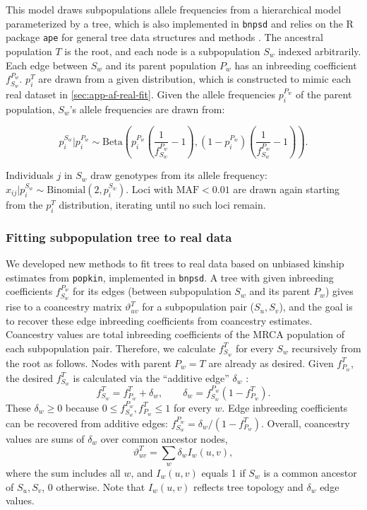 \documentclass[9pt,lineno]{elife}
\newcommand{\xij}[1][j]{x_{i#1}}
\newcommand{\pit}{p_i^T}
\newcommand{\f}[2]{f^{#1}_{#2}}
\newcommand{\ft}[1][j]{f_{#1}^T}
\begin{document}
This model draws subpopulations allele frequencies from a hierarchical model parameterized by a tree, which is also implemented in \texttt{bnpsd} and relies on the R package \texttt{ape} for general tree data structures and methods \citep{paradis_ape_2019}.
The ancestral population $T$ is the root, and each node is a subpopulation $S_w$ indexed arbitrarily.
Each edge between $S_w$ and its parent population $P_w$ has an inbreeding coefficient $\f{P_w}{S_w}$.
$\pit$ are drawn from a given distribution, which is constructed to mimic each real dataset in \autoref{sec:app-af-real-fit}.
Given the allele frequencies $p_i^{P_w}$ of the parent population, $S_w$'s allele frequencies are drawn from:
\begin{linenomath*}
  $$
  p_i^{S_w} | p_i^{P_w}
  \sim
  \text{Beta} \left(
    p_i^{P_w} \left( \frac{1}{ \f{P_w}{S_w} } - 1 \right),
    \left( 1 - p_i^{P_w} \right) \left( \frac{1}{ \f{P_w}{S_w} } - 1 \right)
  \right)
  .
  $$
\end{linenomath*}
Individuals $j$ in $S_w$ draw genotypes from its allele frequency:
$
\xij | p_i^{S_w}
\sim
\text{Binomial}\left( 2, p_i^{S_w} \right)
.
$
Loci with $\text{MAF} < 0.01$ are drawn again starting from the $\pit$ distribution, iterating until no such loci remain.

\subsubsection{Fitting subpopulation tree to real data}

We developed new methods to fit trees to real data based on unbiased kinship estimates from \texttt{popkin}, implemented in \texttt{bnpsd}.
A tree with given inbreeding coefficients $\f{P_w}{S_w}$ for its edges (between subpopulation $S_w$ and its parent $P_w$) gives rise to a coancestry matrix $\vartheta_{uv}^T$ for a subpopulation pair ($S_u,S_v$), and the goal is to recover these edge inbreeding coefficients from coancestry estimates.
Coancestry values are total inbreeding coefficients of the MRCA population of each subpopulation pair.
Therefore, we calculate $\ft[S_w]$ for every $S_w$ recursively from the root as follows.
Nodes with parent $P_w = T$ are already as desired.
Given $\ft[P_w]$, the desired $\ft[S_w]$ is calculated via the ``additive edge'' $\delta_w$ \citep{ochoa_estimating_2021}:
\begin{equation}
  \label{eq:inbr_total_additive}
  \ft[S_w] = \ft[P_w] + \delta_w,
  \quad\quad
  \delta_w = \f{P_w}{S_w} \left( 1 - \ft[P_w] \right).
\end{equation}
These $\delta_w \ge 0$ because $0 \le \f{P_w}{S_w}, \ft[P_w] \le 1$ for every $w$.
Edge inbreeding coefficients can be recovered from additive edges:
$\f{P_w}{S_w} = \delta_w /( 1 - \ft[P_w] )$.
Overall, coancestry values are sums of $\delta_w$ over common ancestor nodes,
\begin{equation}
  \label{eq:coanc_tree_additive}
  \vartheta_{uv}^T
  =
  \sum_w \delta_w I_w(u,v)
  ,
\end{equation}
where the sum includes all $w$, and $I_w(u,v)$ equals 1 if $S_w$ is a common ancestor of $S_u,S_v$, 0 otherwise.
Note that $I_w(u,v)$ reflects tree topology and $\delta_w$ edge values.
\end{document}
